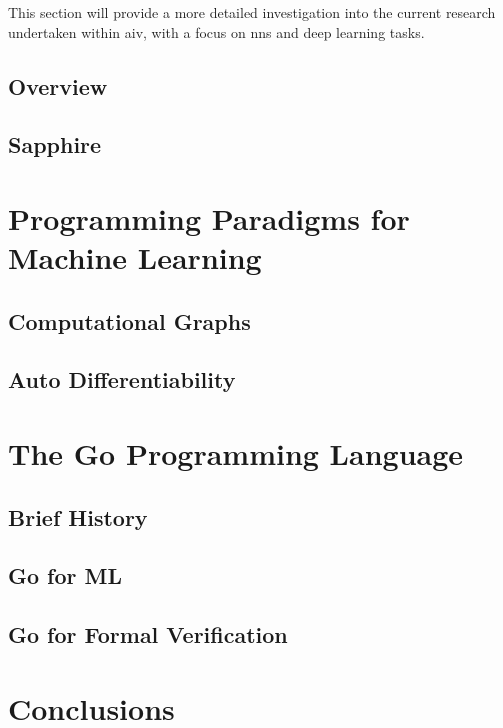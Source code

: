 This section will provide a more detailed investigation into the current research
undertaken within \gls{aiv}, with a focus on \glspl{nn} and deep learning tasks.

\subsection{Overview}

\subsection{Sapphire}


\section{Programming Paradigms for Machine Learning}

\subsection{Computational Graphs}
\subsection{Auto Differentiability}

\section{The Go Programming Language}

\subsection{Brief History}
\subsection{Go for ML}
\subsection{Go for Formal Verification}

\section{Conclusions}
